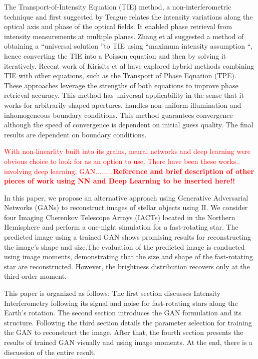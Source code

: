 The Transport-of-Intensity Equation (TIE) method, a non-interferometric technique and first suggested by Teague \citep{Teague1983} relates the intensity variations along the optical axis and phase of the optical fields. It enabled phase retrieval from intensity measurements at multiple planes. Zhang et al suggested a method \citep{Zhang2020} of obtaining a \textquotedblleft universal solution \textquotedblright to TIE using \textquotedblleft maximum intensity assumption \textquotedblleft, hence converting the TIE into a Poisson equation and then by solving it iteratively. Recent work of Kirisits et al \citep{Kirisits2024} have explored hybrid methods combining TIE with other equations, such as the Transport of Phase Equation (TPE). These approaches leverage the strengths of both equations to improve phase retrieval accuracy. This method has universal applicability in the sense that it works for arbitrarily shaped apertures, handles non-uniform illumination and inhomogeneous boundary conditions. This method guarantees convergence although the speed of convergence is dependent on initial guess quality. The final results are dependent on boundary conditions.

\textcolor{red}{With non-linearlity built into its grains, neural networks and deep learning were obvious choice to look for as an option to use. There have been these works.. involving deep learning, GAN.........{\bf Reference and brief description of other pieces of work using NN and Deep Learning to be inserted here!!}}

In this paper, we propose an alternative approach using Generative 
Adversarial Networks (GANs) \citep{goodfellow2014generative} to reconstruct 
images of stellar objects using II. We consider four Imaging Cherenkov 
Telescope Arrays (IACTs) located in the Northern Hemisphere and perform 
a one-night simulation for a fast-rotating star. The predicted image using 
a trained GAN shows promising results for reconstructing the image's shape and 
size.The evaluation of the predicted image is conducted using image moments, 
demonstrating that the size and shape of the fast-rotating star are 
reconstructed. However, the brightness distribution recovers only at the 
third-order moment.

This paper is organized as follows: The first section discusses 
Intensity Interferometry following its signal and noise for fast-rotating 
stars along the Earth's rotation. The second section introduces the GAN 
formulation and its structure. Following the third section details the 
parameter selection for training the GAN to reconstruct the image. 
After that, the fourth section presents the results of trained GAN visually 
and using image moments. At the end, there is a discussion of the entire result.